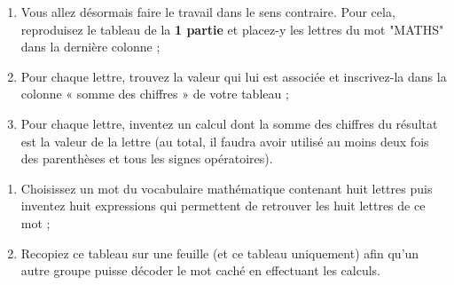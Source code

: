 \begin{TP}

\begin{enumerate}
 \item Vous allez désormais faire le travail dans le sens contraire. Pour cela, reproduisez le tableau de la \textbf{1 partie} et placez-y les lettres du mot "MATHS" dans la dernière colonne ;
 \item Pour chaque lettre, trouvez la valeur qui lui est associée et inscrivez-la dans la colonne « somme des chiffres » de votre tableau ;
 \item Pour chaque lettre, inventez un calcul dont la somme des chiffres du résultat est la valeur de la lettre (au total, il faudra avoir utilisé au moins deux fois des parenthèses et tous les signes opératoires).
\end{enumerate}



\begin{enumerate}
 \item Choisissez un mot du vocabulaire mathématique contenant huit lettres puis inventez huit expressions qui permettent de retrouver les huit lettres de ce mot ;
 \item Recopiez ce tableau sur une feuille (et ce tableau uniquement) afin qu'un autre groupe puisse décoder le mot caché en effectuant les calculs.
 
 \end{enumerate}

\end{TP}



